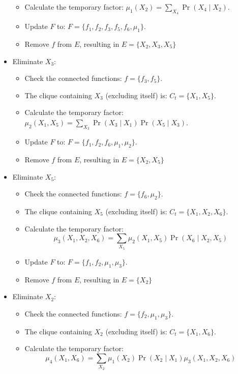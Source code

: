 \begin{example}
\begin{itemize}
\begin{itemize}
                \item Calculate the temporary factor: $\mu_1(X_2)=\sum_{X_4}\Pr(X_4\mid X_2)$. 
                \item Update $F$ to: $F=\{f_1,f_2,f_3,f_5,f_6,\mu_1\}$. 
                \item Remove $f$ from $E$, resulting in $E=\{X_2,X_3,X_5\}$
            \end{itemize}
        \item Eliminate $X_3$: 
            \begin{itemize}
                \item Check the connected functions: $f=\{f_3,f_5\}$. 
                \item The clique containing $X_3$ (excluding itself) is: $C_t=\{X_1,X_5\}$. 
                \item Calculate the temporary factor: $\mu_2(X_1,X_5)=\sum_{X_3}\Pr(X_3\mid X_1)\Pr(X_5\mid X_3)$. 
                \item Update $F$ to: $F=\{f_1,f_2,f_6,\mu_1,\mu_2\}$. 
                \item Remove $f$ from $E$, resulting in $E=\{X_2,X_5\}$
            \end{itemize}
        \item Eliminate $X_5$: 
            \begin{itemize}
                \item Check the connected functions: $f=\{f_6,\mu_2\}$. 
                \item The clique containing $X_5$ (excluding itself) is: $C_t=\{X_1,X_2,X_6\}$. 
                \item Calculate the temporary factor: 
                \[\mu_3(X_1,X_2,X_6)=\sum_{X_5}\mu_2(X_1,X_5)\Pr(X_6\mid X_2,X_5)\]
                \item Update $F$ to: $F=\{f_1,f_2,\mu_1,\mu_3\}$. 
                \item Remove $f$ from $E$, resulting in $E=\{X_2\}$
            \end{itemize}
        \item Eliminate $X_2$: 
            \begin{itemize}
                \item Check the connected functions: $f=\{f_2,\mu_1,\mu_3\}$. 
                \item The clique containing $X_2$ (excluding itself) is: $C_t=\{X_1,X_6\}$. 
                \item Calculate the temporary factor: 
                \[\mu_4(X_1,X_6)=\sum_{X_2}\mu_1(X_2)\Pr(X_2\mid X_1)\mu_3(X_1,X_2,X_6)\]

\end{itemize}
\end{itemize}
\end{example}
